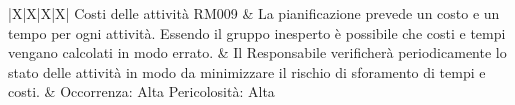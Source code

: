 \begin{tabularx}{\textwidth}{|X|X|X|X|}
	Costi delle attività \newline RM009 & La pianificazione prevede un costo e un tempo per ogni attività. Essendo il gruppo inesperto è possibile che costi e tempi vengano calcolati in modo errato. & Il Responsabile verificherà periodicamente lo stato delle attività in modo da minimizzare il rischio di sforamento di tempi e costi. & Occorrenza: Alta \newline Pericolosità: Alta \\
	\hline
	\\
	\hline	
 
    \end{tabularx}

